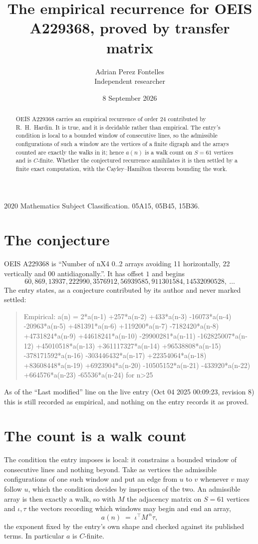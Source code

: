 \documentclass[11pt,a4paper]{article}
\title{The empirical recurrence for OEIS A229368, proved by transfer matrix}
\author{Adrian Perez Fontelles\\ \small Independent researcher}
\date{8 September 2026}
\theoremstyle{plain}
\theoremstyle{definition}
\begin{document}
\maketitle

\begin{abstract}
OEIS A229368 carries an empirical recurrence of order $24$ contributed by R.~H.~Hardin. It is
true, and it is decidable rather than empirical. The entry's condition is local to a bounded window of consecutive lines, so
the admissible configurations of such a window are the vertices of a finite digraph and the
arrays counted are exactly the walks in it; hence $a(n)$ is a walk count on $S=61$ vertices
and is $C$-finite. Whether the conjectured recurrence annihilates it is then settled by a
finite exact computation, with the Cayley--Hamilton theorem bounding the work.
\end{abstract}

\noindent\small 2020 Mathematics Subject Classification. 05A15, 05B45, 15B36.\normalsize

\section{The conjecture}

OEIS A229368 is ``Number of nX4 0..2 arrays avoiding 11 horizontally, 22 vertically and 00 antidiagonally.''. It has offset $1$ and begins
\[
60, 869, 13937, 222990, 3576912, 56939585, 911301584, 14532090528,\ \dots
\]
The entry states, as a conjecture contributed by its author and never marked settled:
\begin{quote}
Empirical: a(n) = 2*a(n-1) +257*a(n-2) +433*a(n-3) -16073*a(n-4) -20963*a(n-5) +481391*a(n-6) +119200*a(n-7) -7182420*a(n-8) +4731824*a(n-9) +44618241*a(n-10) -29900281*a(n-11) -162825007*a(n-12) +45010518*a(n-13) +361117327*a(n-14) +96538808*a(n-15) -378171592*a(n-16) -303446432*a(n-17) +22354064*a(n-18) +83608448*a(n-19) +6923904*a(n-20) -10505152*a(n-21) -433920*a(n-22) +664576*a(n-23) -65536*a(n-24) for n>25
\end{quote}
As of the ``Last modified'' line on the live entry (Oct 04 2025 00:09:23, revision 8) this is still
recorded as empirical, and nothing on the entry records it as proved.

\section{The count is a walk count}

The condition the entry imposes is local: it constrains a bounded window of consecutive lines and nothing beyond. Take as
vertices the admissible configurations of one such window and put an edge from $u$ to $v$
whenever $v$ may follow $u$, which the condition decides by inspection of the two. An
admissible array is then exactly a walk, so with $M$ the adjacency matrix on $S=61$ vertices
and $\iota,\tau$ the vectors recording which windows may begin and end an array,
\[
a(n)\;=\;\iota^{\!\top}M^{\,n}\tau ,
\]
the exponent fixed by the entry's own shape and checked against its published terms. In
particular $a$ is $C$-finite.
\end{document}
